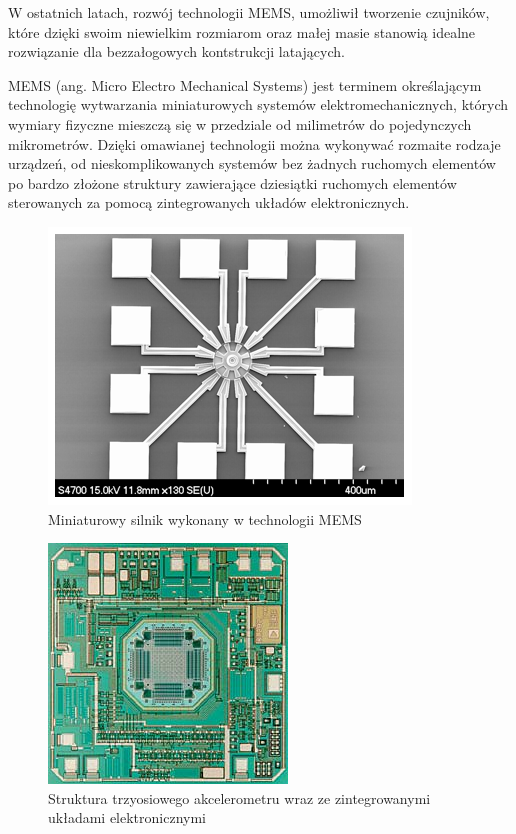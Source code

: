 W ostatnich latach, rozwój technologii MEMS, umożliwił tworzenie czujników, które dzięki swoim niewielkim rozmiarom oraz małej masie stanowią idealne rozwiązanie dla bezzałogowych kontstrukcji latających. 

MEMS (ang. Micro Electro Mechanical Systems) jest terminem określającym technologię wytwarzania miniaturowych systemów elektromechanicznych, których wymiary fizyczne mieszczą się w przedziale od milimetrów do pojedynczych mikrometrów. Dzięki omawianej technologii można wykonywać rozmaite rodzaje urządzeń, od nieskomplikowanych systemów bez żadnych ruchomych elementów po bardzo złożone struktury zawierające dziesiątki ruchomych elementów sterowanych za pomocą zintegrowanych układów elektronicznych. 

\begin{figure}[H]
	\centering
	\includegraphics[scale=0.7]{Pictures/microactuator.png}
		\caption[Miniaturowy silnik wykonany w technologii MEMS]{Miniaturowy silnik wykonany w technologii MEMS}
	\label{fig:microactuator}
\end{figure}

\begin{figure}[H]
	\centering
	\includegraphics[scale=0.7]{Pictures/3d_accel.jpg}
		\caption[Struktura trzyosiowego akcelerometru wraz ze zintegrowanymi układami elektronicznymi]{Struktura trzyosiowego akcelerometru wraz ze zintegrowanymi układami elektronicznymi}
	\label{fig:3d_accelerometer}
\end{figure}

